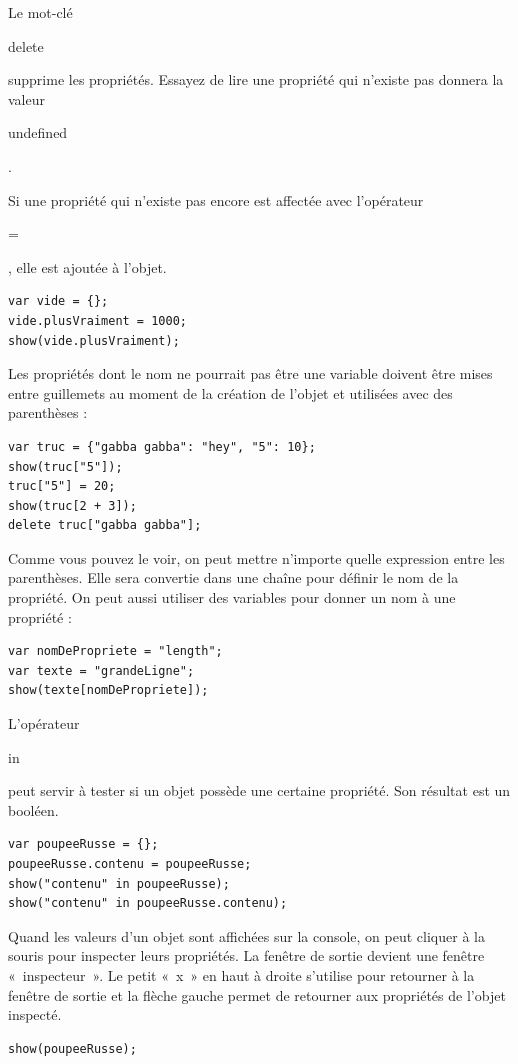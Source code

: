 \documentclass{FramateX}
\renewcommand{\texttt}[1]{\begin{sffamily}{#1}\end{sffamily}}
\begin{document}
Le mot-clé \texttt{delete} supprime les propriétés. Essayez de lire une
propriété qui n'existe pas donnera la valeur \texttt{undefined}.

Si une propriété qui n'existe pas encore est affectée avec l'opérateur
\texttt{=}, elle est ajoutée à l'objet.

\begin{lstlisting}
var vide = {};
vide.plusVraiment = 1000;
show(vide.plusVraiment);
\end{lstlisting}
Les propriétés dont le nom ne pourrait pas être une variable doivent
être mises entre guillemets au moment de la création de l'objet et
utilisées avec des parenthèses :

\begin{lstlisting}
var truc = {"gabba gabba": "hey", "5": 10};
show(truc["5"]);
truc["5"] = 20;
show(truc[2 + 3]);
delete truc["gabba gabba"];
\end{lstlisting}
Comme vous pouvez le voir, on peut mettre n'importe quelle expression
entre les parenthèses. Elle sera convertie dans une chaîne pour définir
le nom de la propriété. On peut aussi utiliser des variables pour donner
un nom à une propriété :

\begin{lstlisting}
var nomDePropriete = "length";
var texte = "grandeLigne";
show(texte[nomDePropriete]);
\end{lstlisting}
L'opérateur \texttt{in} peut servir à tester si un objet possède une
certaine propriété. Son résultat est un booléen.

\begin{lstlisting}
var poupeeRusse = {};
poupeeRusse.contenu = poupeeRusse;
show("contenu" in poupeeRusse);
show("contenu" in poupeeRusse.contenu);
\end{lstlisting}
\begin{center}\end{center}

Quand les valeurs d'un objet sont affichées sur la console, on peut
cliquer à la souris pour inspecter leurs propriétés. La fenêtre de
sortie devient une fenêtre «~inspecteur~». Le petit «~x~» en haut à
droite s'utilise pour retourner à la fenêtre de sortie et la flèche
gauche permet de retourner aux propriétés de l'objet inspecté.

\begin{lstlisting}
show(poupeeRusse);
\end{lstlisting}
\begin{center}\end{center}
\end{document}
